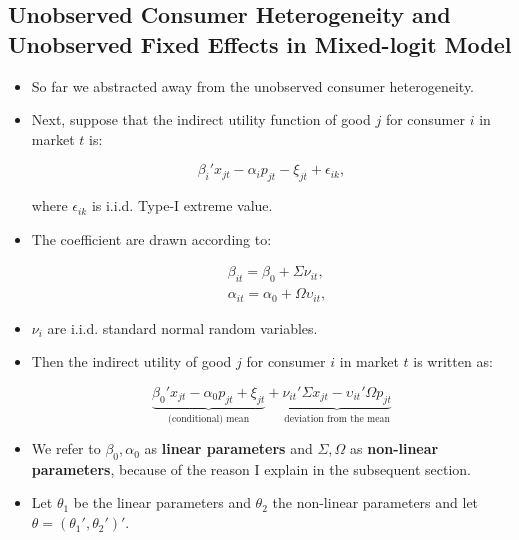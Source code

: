 \documentclass[]{book}
\providecommand{\tightlist}{%
  \setlength{\itemsep}{0pt}\setlength{\parskip}{0pt}}
\begin{document}
\subsection{Unobserved Consumer Heterogeneity and Unobserved Fixed
Effects in Mixed-logit
Model}\label{unobserved-consumer-heterogeneity-and-unobserved-fixed-effects-in-mixed-logit-model}

\begin{itemize}
\tightlist
\item
  So far we abstracted away from the unobserved consumer heterogeneity.
\item
  Next, suppose that the indirect utility function of good \(j\) for
  consumer \(i\) in market \(t\) is:

  \begin{equation}
  \beta_i' x_{jt}  - \alpha_i p_{jt} - \xi_{jt} + \epsilon_{ik},
  \end{equation}

  where \(\epsilon_{ik}\) is i.i.d. Type-I extreme value.
\item
  The coefficient are drawn according to:

  \begin{equation}
  \begin{split}
  &\beta_{it} = \beta_0 + \Sigma \nu_{it},\\
  &\alpha_{it} = \alpha_0 + \Omega \upsilon_{it},
  \end{split}
  \end{equation}
\item
  \(\nu_i\) are i.i.d. standard normal random variables.
\item
  Then the indirect utility of good \(j\) for consumer \(i\) in market
  \(t\) is written as:

  \begin{equation}
  \underbrace{\beta_0' x_{jt} - \alpha_0 p_{jt} + \xi_{jt}}_{\text{(conditional) mean}} + \underbrace{\nu_{it}' \Sigma x_{jt} - \upsilon_{it}' \Omega p_{jt}}_{\text{deviation from the mean}} 
  \end{equation}
\item
  We refer to \(\beta_0, \alpha_0\) as \textbf{linear parameters} and
  \(\Sigma, \Omega\) as \textbf{non-linear parameters}, because of the
  reason I explain in the subsequent section.
\item
  Let \(\theta_1\) be the linear parameters and \(\theta_2\) the
  non-linear parameters and let \(\theta = (\theta_1', \theta_2')'\).
\end{itemize}
\end{document}
